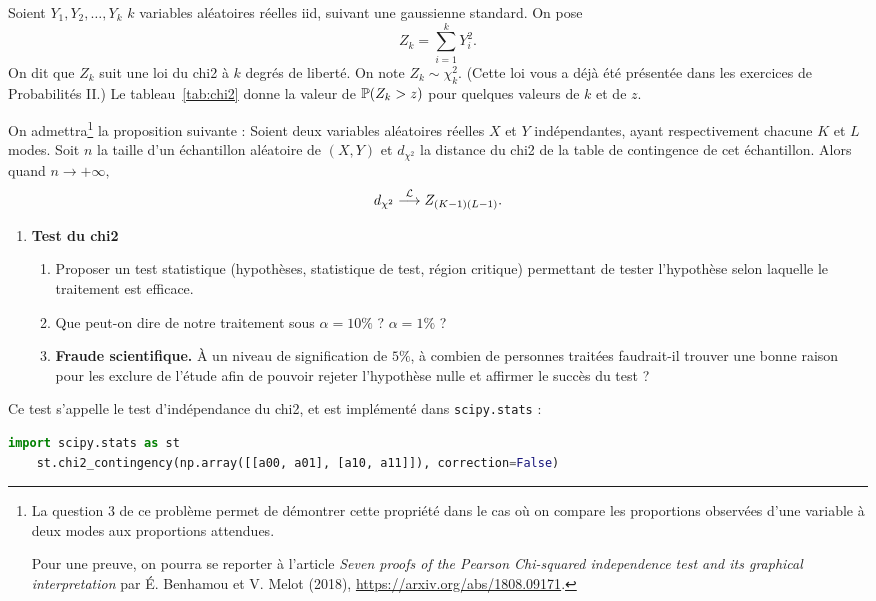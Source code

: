 \documentclass[french,11pt]{article}
\begin{document}
Soient $Y_1, Y_2, \dots, Y_k$ $k$ variables aléatoires réelles iid, suivant une
gaussienne standard. On pose
\[
  Z_k = \sum_{i=1}^k Y_i^2.
\]
On dit que $Z_k$ suit une loi du chi2 à $k$ degrés de liberté. On note
$Z_k \sim \chi_k^2$. (Cette loi vous a déjà été présentée dans les exercices de Probabilités II.)
Le tableau~\ref{tab:chi2} donne la valeur de $\mathbb{P}(Z_k > z)$ pour quelques
valeurs de $k$ et de $z$.


On admettra\footnote{La question 3 de ce problème permet de démontrer
cette propriété dans le cas où on compare les proportions observées d'une
variable à deux modes aux proportions attendues.

Pour une preuve, on pourra se reporter à l'article \textit{Seven proofs of the
  Pearson Chi-squared independence test and its graphical interpretation} par
É. Benhamou et V. Melot (2018),
\href{https://arxiv.org/abs/1808.09171}{https://arxiv.org/abs/1808.09171}.  }
la proposition suivante : Soient deux variables aléatoires réelles $X$ et $Y$
indépendantes, ayant respectivement chacune $K$ et $L$ modes. Soit $n$ la
taille d'un échantillon aléatoire de $(X, Y)$ et $d_{\chi^2}$ la distance du
chi2 de la table de contingence de cet échantillon. Alors quand
$n \rightarrow +\infty,$
\[
  d_{\chi^2} \stackrel{\mathcal{L}}{\longrightarrow} Z_{(K-1)(L-1)}.
\]


\begin{enumerate}[resume]
\item \textbf{Test du chi2}
  \begin{enumerate}
  \item Proposer un test statistique (hypothèses, statistique de test, région
    critique) permettant de tester l'hypothèse selon laquelle le traitement est
    efficace.
  \item Que peut-on dire de notre traitement sous $\alpha = 10\%$ ? $\alpha = 1\%$ ?
  \item \textbf{Fraude scientifique.} À un niveau de
    signification de $5\%$, à combien de personnes traitées faudrait-il trouver
    une bonne raison pour les exclure de l'étude afin de pouvoir rejeter l'hypothèse
    nulle et affirmer le succès du test ?
  \end{enumerate}
\end{enumerate}

Ce test s'appelle le test d'indépendance du chi2, et est implémenté dans \texttt{scipy.stats} :

  \begin{lstlisting}[language=Python]
    import scipy.stats as st
    st.chi2_contingency(np.array([[a00, a01], [a10, a11]]), correction=False)
  \end{lstlisting}
  
\end{document}
